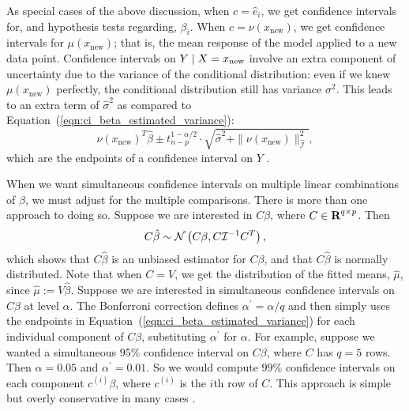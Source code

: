 \documentclass[12pt]{article}
\begin{document}
As special cases of the above discussion, when $c = \hat{e}_i$, we get confidence intervals for, and hypothesis tests regarding, $\beta_i$. When $c = \nu(x_\textrm{new})$, we get confidence intervals for $\mu(x_\textrm{new})$; that is, the mean response of the model applied to a new data point. Confidence intervals on $Y \; | \; X = x_\textrm{new}$ involve an extra component of uncertainty due to the variance of the conditional distribution: even if we knew $\mu(x_\textrm{new})$ perfectly, the conditional distribution still has variance $\sigma^2$. This leads to an extra term of $\hat{\sigma}^2$ as compared to Equation~(\ref{eqn:ci_beta_estimated_variance}):
\begin{displaymath}
\nu(x_\textrm{new})^T \hat{\beta} \pm t_{n-p}^{1-\alpha/2} \cdot \sqrt{\hat{\sigma}^2 + \| \nu(x_\textrm{new}) \|_{\hat{\mathcal{I}}}^2},
\end{displaymath}
which are the endpoints of a confidence interval on $Y$ \cite[\S 3.6]{Weisberg:2005}.

When we want simultaneous confidence intervals on multiple linear combinations of $\beta$, we must adjust for the multiple comparisons. There is more than one approach to doing so. Suppose we are interested in $C \beta$, where $C \in {\mbox{\bf R}}^{q \times p}$. Then
\begin{displaymath}
    C \hat{\beta} \sim {\mathcal N} \left( C \beta, C \mathcal{I}^{-1} C^T \right),
\end{displaymath}
which shows that $C \hat{\beta}$ is an unbiased estimator for $C \beta$, and that $C \hat{\beta}$ is normally distributed. Note that when $C = V$, we get the distribution of the fitted means, $\hat{\mu}$, since $\hat{\mu} := V \hat{\beta}$. Suppose we are interested in simultaneous confidence intervals on $C\beta$ at level $\alpha$. The Bonferroni correction defines $\alpha^\prime = \alpha / q$ and then simply uses the endpoints in Equation~(\ref{eqn:ci_beta_estimated_variance}) for each individual component of $C\beta$, substituting $\alpha^\prime$ for $\alpha$. For example, suppose we wanted a simultaneous $95\%$ confidence interval on $C\beta$, where $C$ has $q=5$ rows. Then $\alpha = 0.05$ and $\alpha^\prime = 0.01$. So we would compute $99\%$ confidence intervals on each component $c^{(i)} \beta$, where $c^{(i)}$ is the $i$th row of $C$. This approach is simple but overly conservative in many cases \cite[\S~9.1.3]{Weisberg:2005}.
\end{document}
